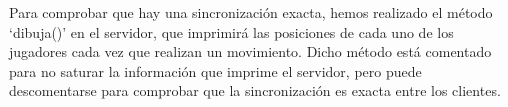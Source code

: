 Para comprobar que hay una sincronización exacta, hemos realizado el método ‘dibuja()’ en el servidor, que imprimirá las posiciones de cada uno de los jugadores cada vez que realizan un movimiento. Dicho método está comentado para no saturar la información que imprime el servidor, pero puede descomentarse para comprobar que la sincronización es exacta entre los clientes.

